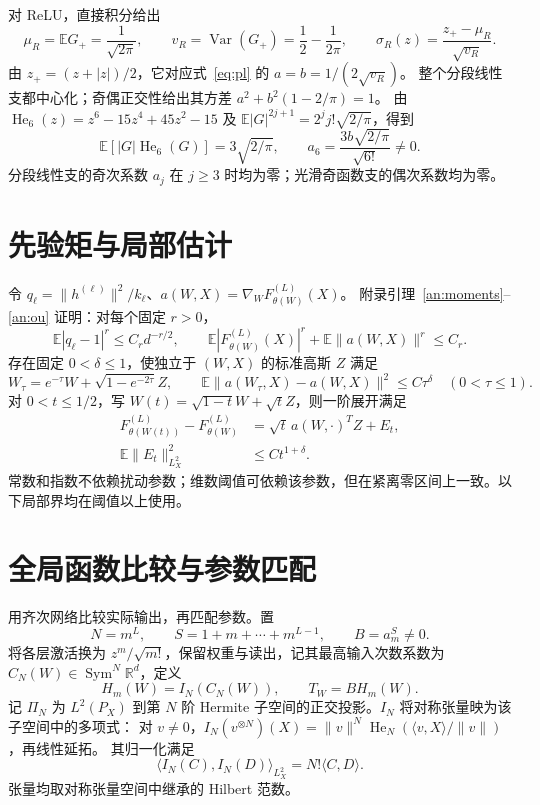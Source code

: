 \documentclass[a4paper]{tufte-handout}
\newcommand{\E}{\mathbb E}
\newcommand{\R}{\mathbb R}
\DeclareMathOperator{\Sym}{Sym}
\begin{document}
\begin{fullwidth}
对 ReLU，直接积分给出
\[
\mu_R=\E G_+=\frac1{\sqrt{2\pi}},\qquad
v_R=\operatorname{Var}(G_+)=\frac12-\frac1{2\pi},\qquad
\sigma_R(z)=\frac{z_+-\mu_R}{\sqrt{v_R}}.
\]
由 $z_+=(z+|z|)/2$，它对应式~\eqref{eq:pl} 的
$a=b=1/(2\sqrt{v_R})$。
整个分段线性支都中心化；奇偶正交性给出其方差
$a^2+b^2(1-2/\pi)=1$。
由 $\operatorname{He}_6(z)=z^6-15z^4+45z^2-15$
及 $\E|G|^{2j+1}=2^j j!\sqrt{2/\pi}$，得到
\[
\E[|G|\operatorname{He}_6(G)]=3\sqrt{2/\pi},\qquad
a_6=\frac{3b\sqrt{2/\pi}}{\sqrt{6!}}\ne0.
\]
分段线性支的奇次系数 $a_j$ 在 $j\ge3$ 时均为零；光滑奇函数支的偶次系数均为零。

\section{先验矩与局部估计}
令 $q_\ell=\|h^{(\ell)}\|^2/k_\ell$、$a(W,X)=\nabla_WF_{\theta(W)}^{(L)}(X)$。
附录引理~\ref{an:moments}--\ref{an:ou} 证明：对每个固定 $r>0$，
\begin{equation}\label{eq:moments}
 \E|q_\ell-1|^r\le C_r d^{-r/2},\qquad
 \E|F_{\theta(W)}^{(L)}(X)|^r+\E\|a(W,X)\|^r\le C_r.
\end{equation}
存在固定 $0<\delta\le1$，使独立于 $(W,X)$ 的标准高斯 $Z$ 满足
\begin{equation}\label{eq:gradient-stability}
 W_\tau=e^{-\tau}W+\sqrt{1-e^{-2\tau}}Z,\qquad
 \E\|a(W_\tau,X)-a(W,X)\|^2\le C\tau^\delta\quad(0<\tau\le1).
\end{equation}
对 $0<t\le1/2$，写 $W(t)=\sqrt{1-t}W+\sqrt tZ$，则一阶展开满足
\begin{equation}\label{eq:ou-rem}
 \begin{aligned}
 F_{\theta(W(t))}^{(L)}-F_{\theta(W)}^{(L)}&=\sqrt t\,a(W,\cdot)^TZ+E_t,\\
 \E\|E_t\|_{L_X^2}^2&\le Ct^{1+\delta}.
 \end{aligned}
\end{equation}
常数和指数不依赖扰动参数；维数阈值可依赖该参数，但在紧离零区间上一致。以下局部界均在阈值以上使用。

\section{全局函数比较与参数匹配}
用齐次网络比较实际输出，再匹配参数。置
\[
N=m^L,\qquad S=1+m+\cdots+m^{L-1},\qquad B=a_m^S\ne0.
\]
将各层激活换为 $z^m/\sqrt{m!}$，保留权重与读出，记其最高输入次数系数为 $C_N(W)\in\Sym^N\R^d$，定义
\[
H_m(W)=I_N(C_N(W)),\qquad T_W=BH_m(W).
\]
记 $\Pi_N$ 为 $L^2(P_X)$ 到第 $N$ 阶 Hermite 子空间的正交投影。$I_N$ 将对称张量映为该子空间中的多项式：
对 $v\ne0$，$I_N(v^{\otimes N})(X)=\|v\|^N\operatorname{He}_N(\langle v,X\rangle/\|v\|)$，再线性延拓。
其归一化满足
\begin{equation}\label{fp:actual-isometry}
 \langle I_N(C),I_N(D)\rangle_{L_X^2}=N!\langle C,D\rangle.
\end{equation}
张量均取对称张量空间中继承的 Hilbert 范数。


\end{fullwidth}
\end{document}

